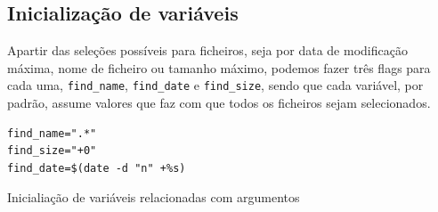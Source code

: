 \subsection{Inicialização de variáveis}
Apartir das seleções possíveis para ficheiros, seja por data
de modificação máxima, nome de ficheiro ou tamanho máximo,
podemos fazer três flags para cada uma, \verb|find_name|,
\verb|find_date| e \verb|find_size|, sendo que cada
variável, por padrão, assume valores que faz com que todos
os ficheiros sejam selecionados.

\begin{listing}[H]
\begin{verbatim}
find_name=".*"
find_size="+0"
find_date=$(date -d "n" +%s)
\end{verbatim}
\caption{Inicialiação de variáveis relacionadas com
argumentos}
\end{listing}
